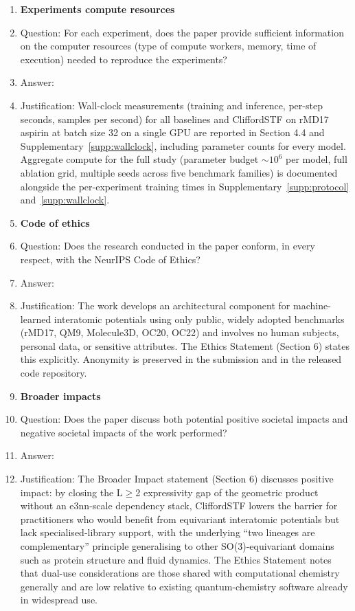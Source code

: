 \begin{enumerate}
\item {\bf Experiments compute resources}
    \item[] Question: For each experiment, does the paper provide sufficient information on the computer resources (type of compute workers, memory, time of execution) needed to reproduce the experiments?
    \item[] Answer: \answerYes{}
    \item[] Justification: Wall-clock measurements (training and inference, per-step seconds, samples per second) for all baselines and CliffordSTF on rMD17 aspirin at batch size 32 on a single GPU are reported in Section 4.4 and Supplementary~\ref{supp:wallclock}, including parameter counts for every model. Aggregate compute for the full study (parameter budget $\sim 10^6$ per model, full ablation grid, multiple seeds across five benchmark families) is documented alongside the per-experiment training times in Supplementary~\ref{supp:protocol} and~\ref{supp:wallclock}.

\item {\bf Code of ethics}
    \item[] Question: Does the research conducted in the paper conform, in every respect, with the NeurIPS Code of Ethics?
    \item[] Answer: \answerYes{}
    \item[] Justification: The work develops an architectural component for machine-learned interatomic potentials using only public, widely adopted benchmarks (rMD17, QM9, Molecule3D, OC20, OC22) and involves no human subjects, personal data, or sensitive attributes. The Ethics Statement (Section 6) states this explicitly. Anonymity is preserved in the submission and in the released code repository.

\item {\bf Broader impacts}
    \item[] Question: Does the paper discuss both potential positive societal impacts and negative societal impacts of the work performed?
    \item[] Answer: \answerYes{}
    \item[] Justification: The Broader Impact statement (Section 6) discusses positive impact: by closing the L$\geq$2 expressivity gap of the geometric product without an e3nn-scale dependency stack, CliffordSTF lowers the barrier for practitioners who would benefit from equivariant interatomic potentials but lack specialised-library support, with the underlying ``two lineages are complementary'' principle generalising to other SO(3)-equivariant domains such as protein structure and fluid dynamics. The Ethics Statement notes that dual-use considerations are those shared with computational chemistry generally and are low relative to existing quantum-chemistry software already in widespread use.


\end{enumerate}
